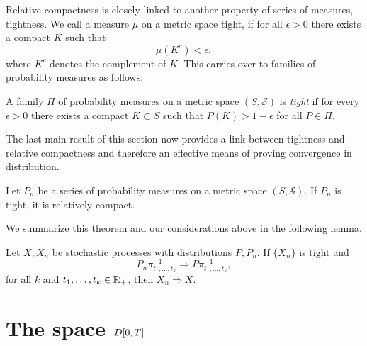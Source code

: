 \bigskip

Relative compactness is closely linked to another property of series of measures, tightness.
We call a measure $\mu$ on a metric space tight,
if for all $\epsilon > 0$ there exists a compact $K$ such that
\begin{equation}
	\mu(K^c) < \epsilon,
\end{equation}
where $K^c$ denotes the complement of $K$.
This carries over to families of probability measures as follows:
\begin{definition} \label{D: tightness}
	A family $\Pi$ of probability measures on a metric space $(S, \mathcal{S})$ is \emph{tight} 
	if for every $\epsilon > 0$ there exists a compact $K \subset S$
	such that $P(K) > 1 - \epsilon$
	for all $P \in \Pi$.	
\end{definition}

The last main result of this section now provides a link between tightness and relative compactness
and therefore an effective means of proving convergence in distribution.

\begin{theorem} \label{T: Prohorov}
	Let $P_n$ be a series of probability measures on a metric space $(S, \mathcal{S})$. 
	If $P_n$ is tight, it is relatively compact.
\end{theorem}

We summarize this theorem and our considerations above in the following lemma.

\begin{lemma} \label{L: tightness and fidi}
	Let $X, X_n$ be stochastic processes with distributions $P, P_n$.
	If $\{X_n\}$  is tight and
	\begin{equation*}
		P_n\pi^{-1}_{t_1, \dots, t_k} \Rightarrow P\pi^{-1}_{t_1, \dots, t_k},
	\end{equation*}
	for all $k$ and $t_1, \dots, t_k \in \mathbb{R}_+$,
	then $X_n \Rightarrow X$.
\end{lemma}


\section{The space $D[0, T]$} \label{S: space DT}

